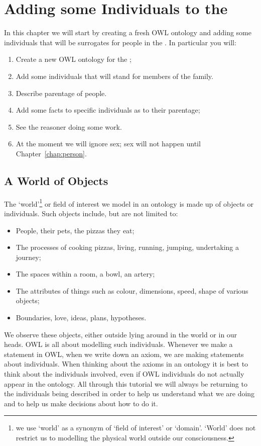 \chapter{Adding some Individuals to the \fhkb}
\label{chap:indiv}

In this chapter we will start by creating a fresh OWL ontology and adding some individuals that will be surrogates for people in the \fhkb. In particular you will:

\begin{enumerate}
\item Create a new OWL ontology for the \fhkb;
\item Add some individuals that will stand for members of the \stevens family.
\item Describe parentage of people.
\item Add some facts to specific individuals as to their parentage;
\item See the reasoner doing some work.
\item At the moment we will ignore sex; sex will not happen until Chapter~\ref{chap:person}.
\end{enumerate}

\section{A World of Objects}

The `world'\footnote{we use `world' as a synonym of `field of interest' or `domain'. `World' does not restrict us to modelling the physical world outside our consciousness. } or field of interest we model in an ontology is made up of objects or individuals. Such objects include, but are not limited to:
\begin{itemize}
\item People, their pets, the pizzas they eat;
\item The processes of cooking pizzas, living, running, jumping, undertaking a journey;
\item The spaces within a room, a bowl, an artery;
\item The attributes of things such as colour, dimensions, speed, shape of various objects;
\item Boundaries, love, ideas, plans, hypotheses.
\end{itemize}
\noindent We observe these objects, either outside lying around in the world or in our heads. OWL is all about modelling such individuals. Whenever we make a statement in OWL, when we write down an axiom, we are making statements about individuals. When thinking about the axioms in an ontology it is best to think about the individuals involved, even if OWL individuals do not actually appear in the ontology. All through this tutorial we will always be returning to the individuals being described in order to help us understand what we are doing and to help us make decisions about how to do it.

